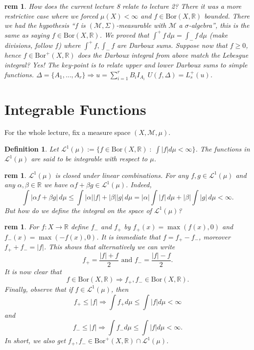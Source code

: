 \documentclass[letterpaper, 12pt]{article}
\newcommand{\st}{\; : \; }
\newcommand{\fin}{\qquad \quad \hfill \framebox[1.75mm][l]{\,}}
\newcommand{\cL}{\mathcal{L}}
\newcommand{\cM}{\mathcal{M}}
\newcommand{\bR}{\mathbb{R}}
\newcommand{\Bor}{\mathrm{Bor}}
\providecommand{\abs}[1]{\left\lvert#1\right\rvert}
\theoremstyle{stdthm}
\theoremstyle{stddef}
\newtheorem{defn}[thm]{Definition}
\newtheorem{rem}[thm]{rem} %
\theoremstyle{stdnonum}
\theoremstyle{stdqands}
\theoremstyle{stdbold}
\begin{document}
\begin{rem}
How does the current lecture 8 relate to lecture 2? There it was a more restrictive case where we forced $\mu(X) < \infty$ and $f \in \mathrm{Bor}(X,\bR)$ bounded.  There we had the hypothesis ``$f$ is $(\cM, \Sigma)$-measurable with $\cM$ a $\sigma$-algebra'', this is the same as saying $f \in \mathrm{Bor}(X,\bR)$. We proved that $\int^+ f \, d\mu = \int_{-} f\, d\mu$ (make divisions, follow $f$) where $\int^+f, \int_{-}f$ are Darboux sums. Suppose now that $f\geq 0$, hence $f \in \mathrm{Bor}^+(X,\bR)$ does the Darboux integral from above match the Lebesgue integral? Yes! The key-point is to relate upper and lower Darboux sums to simple functions. $\Delta = \{A_1,...,A_r\}\Rightarrow u = \sum_{i=1}^r B_i I_{A_i}$ $U(f,\Delta) = L_s^+(u)$. 
\end{rem}

\newpage

\section{Integrable Functions}

For the whole lecture, fix a measure space $(X,\cM,\mu)$. 

\begin{defn}
Let $\cL^1(\mu) := \{f \in \Bor(X,\bR) \st \int |f|d\mu < \infty \}$. The functions in $\cL^1(\mu)$ are said to be integrable with respect to $\mu$. 
\end{defn}

\begin{rem}
$\cL^1(\mu)$ is closed under linear combinations. For any $f,g \in \cL^1(\mu)$ and any $\alpha, \beta \in \bR$ we have $\alpha f + \beta g \in \cL^1(\mu)$. Indeed, 
\[\int \abs{\alpha f + \beta g} \, d\mu \leq \int \abs{\alpha} \abs{f} + \abs{\beta}\abs{g} \, d\mu = \abs{\alpha} \int \abs{f} \, d\mu + \abs{\beta} \int \abs{g} \, d\mu < \infty.
\]
But how do we define the integral on the space of $\cL^1(\mu)$?
\end{rem}

\begin{rem}
For $f : X\rightarrow \bR$ define $f_-$ and  $f_+$ by $f_+ (x) = \max(f(x),0)$ and $f_{-} (x) = \max(-f(x),0)$. It is immediate that $f = f_+ - f_{-}$, moreover $f_+ + f_{-} = |f|$. This shows that alternatively we can write 
\[
f_+ = \frac{|f|+ f}{2} \mbox{ and }
f_{-} = \frac{|f| - f}{2}.
\]
It is now clear that 
\[
f \in \Bor(X,\bR) \Longrightarrow f_+, f_{-} \in \Bor(X,\bR).
\]
Finally, observe that if $f \in \cL^1(\mu)$, then 
\[
f_+ \leq |f| \Longrightarrow \int f_+ d\mu \leq \int |f| d\mu < \infty\]
and
\[
f_{-} \leq |f| \Longrightarrow \int f_{-} d\mu \leq \int |f| d\mu < \infty.
\]
In short, we also get $f_+, f_{-} \in \Bor^+(X,\bR) \cap \cL^1(\mu)$.
\end{rem}
\end{document}

